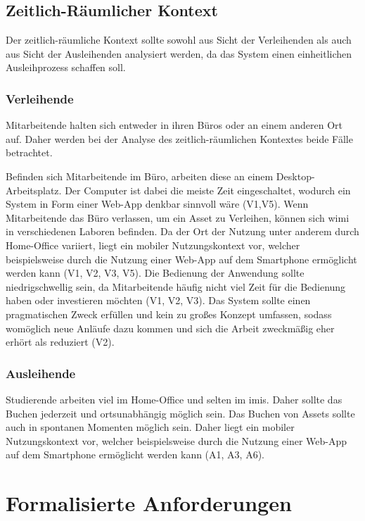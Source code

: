 \subsection{Zeitlich-Räumlicher Kontext}
\label{section:zeit}
Der zeitlich-räumliche Kontext sollte sowohl aus Sicht der Verleihenden als auch
aus Sicht der Ausleihenden analysiert werden, da das System einen
einheitlichen Ausleihprozess schaffen soll.

\subsubsection{Verleihende}
Mitarbeitende halten sich entweder in ihren Büros oder an einem anderen Ort auf.
Daher werden bei der Analyse des zeitlich-räumlichen Kontextes beide Fälle
betrachtet.

Befinden sich Mitarbeitende im Büro, arbeiten diese an einem
Desktop-Arbeitsplatz. Der Computer ist dabei die meiste Zeit eingeschaltet,
wodurch ein System in Form einer Web-App denkbar sinnvoll wäre (V1,V5). Wenn
Mitarbeitende das Büro verlassen, um ein Asset zu Verleihen, können sich
\ac{wimi} in verschiedenen Laboren befinden. Da der Ort der Nutzung unter
anderem durch Home-Office variiert, liegt ein mobiler Nutzungskontext vor,
welcher beispielsweise durch die Nutzung einer Web-App auf dem Smartphone
ermöglicht werden kann (V1, V2, V3, V5). Die Bedienung der Anwendung sollte
niedrigschwellig sein, da Mitarbeitende häufig nicht viel Zeit für die Bedienung
haben oder investieren möchten (V1, V2, V3). Das System sollte einen
pragmatischen Zweck erfüllen und kein zu großes Konzept umfassen, sodass
womöglich neue Anläufe dazu kommen und sich die Arbeit zweckmäßig eher erhört
als reduziert (V2).


\subsubsection{Ausleihende}
Studierende arbeiten viel im Home-Office und selten im \ac{imis}. Daher sollte
das Buchen jederzeit und ortsunabhängig möglich sein. Das Buchen von Assets
sollte auch in spontanen Momenten möglich sein. Daher liegt ein mobiler
Nutzungskontext vor, welcher beispielsweise durch die Nutzung einer Web-App auf
dem Smartphone ermöglicht werden kann (A1, A3, A6).


\section{Formalisierte Anforderungen}
\label{section:anforderung}

